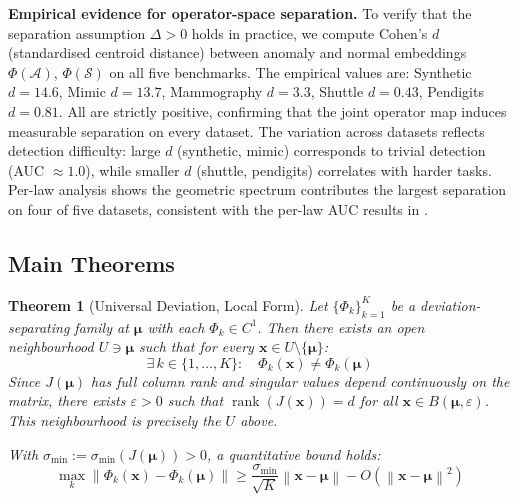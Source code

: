 \documentclass{article}
\newtheorem{theorem}{Theorem}
\newcommand{\Nset}{\mathcal{S}}  %
\newcommand{\norm}[1]{\left\lVert#1\right\rVert}
\DeclareMathOperator{\rank}{rank}
\begin{document}
\textbf{Empirical evidence for operator-space separation.} To verify that the separation assumption $\Delta > 0$ holds in practice, we compute Cohen's $d$ (standardised centroid distance) between anomaly and normal embeddings $\Phi(\mathcal{A})$, $\Phi(\Nset)$ on all five benchmarks. The empirical values are: Synthetic $d=14.6$, Mimic $d=13.7$, Mammography $d=3.3$, Shuttle $d=0.43$, Pendigits $d=0.81$. All are strictly positive, confirming that the joint operator map induces measurable separation on every dataset. The variation across datasets reflects detection difficulty: large $d$ (synthetic, mimic) corresponds to trivial detection (AUC $\approx 1.0$), while smaller $d$ (shuttle, pendigits) correlates with harder tasks. Per-law analysis shows the geometric spectrum contributes the largest separation on four of five datasets, consistent with the per-law AUC results in .

\subsection{Main Theorems}

\begin{theorem}[Universal Deviation, Local Form]
\label{thm:local}
Let $\{\Phi_k\}_{k=1}^K$ be a deviation-separating family at $\bm{\mu}$ with each $\Phi_k \in C^1$. Then there exists an open neighbourhood $U \ni \bm{\mu}$ such that for every $\mathbf{x} \in U \setminus \{\bm{\mu}\}$:
\begin{equation}
\exists\, k \in \{1,\ldots,K\}: \quad \Phi_k(\mathbf{x}) \neq \Phi_k(\bm{\mu})
\end{equation}
Since $J(\bm{\mu})$ has full column rank and singular values depend continuously on the matrix, there exists $\varepsilon > 0$ such that $\rank(J(\mathbf{x})) = d$ for all $\mathbf{x} \in B(\bm{\mu}, \varepsilon)$. This neighbourhood is precisely the $U$ above.

With $\sigma_{\min} := \sigma_{\min}(J(\bm{\mu})) > 0$, a quantitative bound holds:
\begin{equation}
\max_{k} \norm{\Phi_k(\mathbf{x}) - \Phi_k(\bm{\mu})} \geq \frac{\sigma_{\min}}{\sqrt{K}} \norm{\mathbf{x} - \bm{\mu}} - O(\norm{\mathbf{x} - \bm{\mu}}^2)
\label{eq:quantitative}
\end{equation}
\end{theorem}
\end{document}
